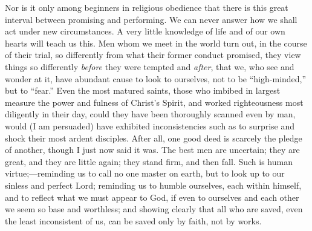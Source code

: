 Nor is it only among beginners in religious obedience
that there is this great interval between promising and
performing. We can never answer how we shall act under
new circumstances. A very little knowledge of life and of
our own hearts will teach us this. Men whom we meet in
the world turn out, in the course of their trial, so
differently from what their former conduct promised, they
view things so differently \emph{before} they were
tempted and \emph{after}, that we, who see and wonder at
it, have abundant cause to look to ourselves, not to be
``high-minded,'' but to ``fear.'' Even
the most matured saints, those who imbibed in largest
measure the power and fulness of Christ's Spirit, and
worked righteousness most diligently in their day, could
they have been thoroughly scanned even by man, would (I
am persuaded) have exhibited inconsistencies such as to
surprise and shock their most ardent disciples. After
all, one good deed is scarcely the pledge of another,
though I just now said it was. The best men are
uncertain; they are great, and they are little again;
they stand firm, and then fall. Such is human
virtue;—reminding us to call no one master on earth,
but to look up to our sinless and perfect Lord; reminding
us to humble ourselves, each within himself, and to
reflect what we must appear to God, if even to ourselves
and each other we seem so base and worthless; and showing
clearly that all who are saved, even the least
inconsistent of us, can be saved only by faith, not by
works.

